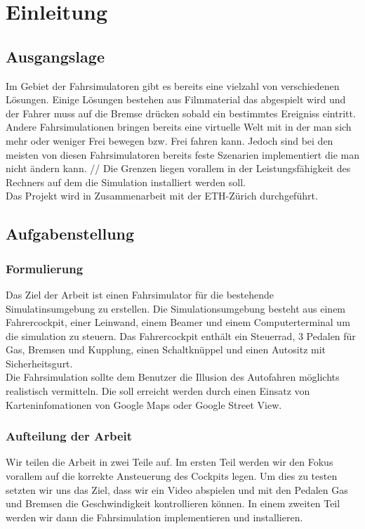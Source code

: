 \section{Einleitung}

\subsection{Ausgangslage}
Im Gebiet der Fahrsimulatoren gibt es bereits eine vielzahl von verschiedenen Lösungen. Einige Lösungen bestehen aus Filmmaterial das abgespielt wird und der Fahrer muss auf die Bremse drücken sobald ein bestimmtes Ereigniss eintritt. Andere Fahrsimulationen bringen bereits eine virtuelle Welt mit in der man sich mehr oder weniger Frei bewegen bzw. Frei fahren kann. Jedoch sind bei den meisten von diesen Fahrsimulatoren bereits feste Szenarien implementiert die man nicht ändern kann. //
Die Grenzen liegen vorallem in der Leistungsfähigkeit des Rechners auf dem die Simulation installiert werden soll. \\
Das Projekt wird in Zusammenarbeit mit der ETH-Zürich durchgeführt. 


\subsection{Aufgabenstellung}
\subsubsection{Formulierung}
Das Ziel der Arbeit ist einen Fahrsimulator für die bestehende Simulatinsumgebung zu erstellen. Die Simulationsumgebung besteht aus einem Fahrercockpit, einer Leinwand, einem Beamer und einem Computerterminal um die simulation zu steuern. Das Fahrercockpit enthält ein Steuerrad, 3 Pedalen für Gas, Bremsen und Kupplung, einen Schaltknüppel und einen Autositz mit Sicherheitsgurt.\\
Die Fahrsimulation sollte dem Benutzer die Illusion des Autofahren möglichts realistisch vermitteln. Die soll erreicht werden durch einen Einsatz von Karteninfomationen von Google Maps oder Google Street View. 

\subsubsection{Aufteilung der Arbeit}
Wir teilen die Arbeit in zwei Teile auf. Im ersten Teil werden wir den Fokus vorallem auf die korrekte Ansteuerung des Cockpits legen. Um dies zu testen setzten wir uns das Ziel, dass wir ein Video abspielen und mit den Pedalen Gas und Bremsen die Geschwindigkeit kontrollieren können. In einem zweiten Teil werden wir dann die Fahrsimulation implementieren und installieren.